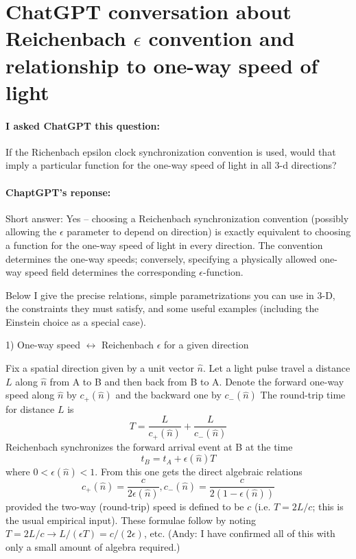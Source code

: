\documentclass[a4paper]{article}
\theoremstyle{plain}
\theoremstyle{definition}
\newcommand{\hatvec}[1]{\hat{#1}}
\begin{document}
\section{ChatGPT conversation about Reichenbach $\epsilon$ convention and relationship to one-way speed of light}
\label{app:reichenback-epsilon}


\paragraph{I asked ChatGPT this question:}

If the Richenbach epsilon clock synchronization convention is used,
would that imply a particular function for the one-way speed of light
in all 3-d directions?


\paragraph{ChaptGPT's reponse:}

Short answer: Yes -- choosing a Reichenbach synchronization convention
(possibly allowing the $\epsilon$ parameter to depend on direction) is
exactly equivalent to choosing a function for the one-way speed of
light in every direction.  The convention determines the one-way
speeds; conversely, specifying a physically allowed one-way speed
field determines the corresponding $\epsilon$-function.

Below I give the precise relations, simple parametrizations you can
use in 3-D, the constraints they must satisfy, and some useful
examples (including the Einstein choice as a special case).

1) One-way speed $\leftrightarrow$ Reichenbach $\epsilon$ for a given direction

Fix a spatial direction given by a unit vector $\hatvec{n}$.
Let a light pulse travel a distance $L$
along $\hatvec{n}$
from A to B and then back from B to A.
Denote the forward one-way speed along $\hatvec{n}$ by
$c_{+}(\hatvec{n})$
and the backward one by 
$c_{-}(\hatvec{n})$
The round-trip time for distance $L$ is
\begin{equation}
T = \frac{L}{c_{+}(\hatvec{n})} + \frac{L}{c_{-}(\hatvec{n})}
\end{equation}
Reichenbach synchronizes the forward arrival event at B at the time
\begin{equation}
t_B = t_A + \epsilon(\hatvec{n}) T
\end{equation}
where $0 < \epsilon(\hatvec{n}) < 1$.
From this one gets the direct algebraic relations
\begin{equation}
c_{+}(\hatvec{n}) = \frac{c}{2 \epsilon(\hatvec{n})}, c_{-}(\hatvec{n}) = \frac{c}{2(1-\epsilon(\hatvec{n}))}
\end{equation}
provided the two-way (round-trip) speed is defined to be $c$
(i.e. $T = 2L/c$; this is the usual empirical input).
These formulae follow by noting $T = 2L/c \rightarrow L/(\epsilon T) =
c/(2 \epsilon)$, etc.  (Andy: I have confirmed all of this with
only a small amount of algebra required.)
\end{document}
